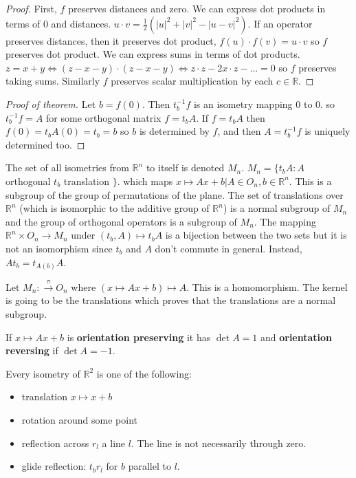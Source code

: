 \documentclass{article}
\newcommand{\vocab}[1]{\textbf{\color{blue!90}\boldmath #1}}
\newcommand{\R}{\mathbb{R}}
\newcommand{\ra}[1][]{\xrightarrow{#1}}
\begin{document}
\begin{proof}
First, $f$ preserves distances and zero. We can express dot products in terms of 0 and distances. $u\cdot v=\frac{1}{2}(|u|^2+|v|^2-|u-v|^2)$. If an operator preserves distances, then it preserves dot product, $f(u)\cdot f(v)=u\cdot v$ so $f$ preserves dot product. We can express sums in terms of dot products. $z=x+y\iff (z-x-y)\cdot(z-x-y)\iff z\cdot z-2x\cdot z-...=0$ so $f$ preserves taking sums. Similarly $f$ preserves scalar multiplication by each $c\in \R$.
\end{proof}
\begin{proof}[Proof of theorem]
Let $b=f(0)$. Then $t_b^{-1}f$ is an isometry mapping 0 to 0. so $t^{-1}_bf=A$ for some orthogonal matrix $f=t_bA$. If $f=t_bA$ then $f(0)=t_bA(0)=t_b=b$ so $b$ is determined by $f$, and then $A=t^{-1}_bf$ is uniquely determined too.
\end{proof}
\begin{definition}
The set of all isometries from $\R^n$ to itself is denoted $M_n$. $M_n=\{t_bA:A$ orthogonal $t_b$ translation $\}$. which maps $x\mapsto Ax+b|A\in O_n, b\in \R^n$. This is a subgroup of the group of permutations of the plane. The set of translations over $\R^n$ (which is isomorphic to the additive group of $\R^n$) is a normal subgroup of $M_n$ and the group of orthogonal operators is a subgroup of $M_n$. The mapping $\R^n\times O_n\ra M_n$ under $(t_b,A)\mapsto t_bA$ is a bijection between the two sets but it is not an isomorphism since $t_b$ and $A$ don't commute in general. Instead, $At_b=t_{A(b)}A$.
\end{definition}
Let $M_n:\ra[\pi]O_n$ where $(x\mapsto Ax+b)\mapsto A$. This is a homomorphism. The kernel is going to be the translations which proves that the translations are a normal subgroup.
\begin{definition}
If $x\mapsto Ax+b$ is \vocab{orientation preserving} it has $\det A=1$ and \vocab{orientation reversing} if $\det A=-1$.
\end{definition}
\begin{theorem}
Every isometry of $\R^2$ is one of the following:
\begin{itemize}
    \item translation $x\mapsto x+b$
    \item rotation around some point
    \item reflection across $r_l$ a line $l$. The line is not necessarily through zero.
    \item glide reflection: $t_br_l$ for $b$ parallel to $l$.
\end{itemize}
\end{theorem}
\end{document}
